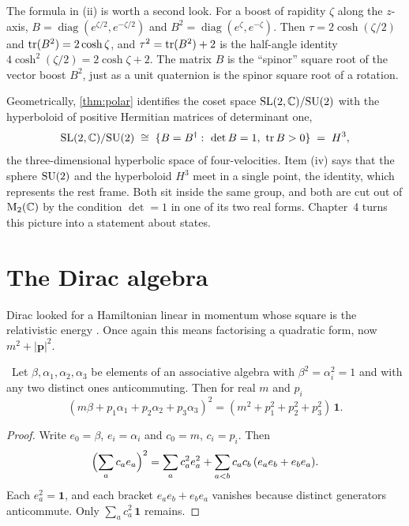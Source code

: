 The formula in (ii) is worth a second look. For a boost of rapidity $\zeta$ along the $z$-axis, $B=\operatorname{diag}(e^{\zeta/2},e^{-\zeta/2})$ and $B^2=\operatorname{diag}(e^{\zeta},e^{-\zeta})$. Then $\tau=2\cosh(\zeta/2)$ and $\operatorname{tr}(B^2)=2\cosh\zeta$, and $\tau^2=\operatorname{tr}(B^2)+2$ is the half-angle identity $4\cosh^2(\zeta/2)=2\cosh\zeta+2$. The matrix $B$ is the ``spinor'' square root of the vector boost $B^2$, just as a unit quaternion is the spinor square root of a rotation.

Geometrically, \cref{thm:polar} identifies the coset space $\mathrm{SL}(2,\mathbb{C})/\mathrm{SU}(2)$ with the hyperboloid of positive Hermitian matrices of determinant one,
\[
\mathrm{SL}(2,\mathbb{C})/\mathrm{SU}(2)\;\cong\;\{B=B^\dagger:\ \det B=1,\ \operatorname{tr} B>0\}\;=\;H^3 ,
\]
the three-dimensional hyperbolic space of four-velocities. Item (iv) says that the sphere $\mathrm{SU}(2)$ and the hyperboloid $H^3$ meet in a single point, the identity, which represents the rest frame. Both sit inside the same group, and both are cut out of $\mathrm{M}_2(\mathbb{C})$ by the condition $\det=1$ in one of its two real forms. Chapter~4 turns this picture into a statement about states.

\section{The Dirac algebra}

Dirac looked for a Hamiltonian linear in momentum whose square is the relativistic energy \cite{Dirac1928}. Once again this means factorising a quadratic form, now $m^2+|\mathbf p|^2$.

\begin{theorem}\label{thm:diracsq}\ver\
Let $\beta,\alpha_1,\alpha_2,\alpha_3$ be elements of an associative algebra with $\beta^2=\alpha_i^2=1$ and with any two distinct ones anticommuting. Then for real $m$ and $p_i$
\[
(m\beta+p_1\alpha_1+p_2\alpha_2+p_3\alpha_3)^2=(m^2+p_1^2+p_2^2+p_3^2)\,\mathbf 1 .
\]
\end{theorem}
\begin{proof}
Write $e_0=\beta$, $e_i=\alpha_i$ and $c_0=m$, $c_i=p_i$. Then
\[
\Bigl(\sum_ac_ae_a\Bigr)^2=\sum_ac_a^2e_a^2+\sum_{a<b}c_ac_b\,(e_ae_b+e_be_a).
\]
Each $e_a^2=\mathbf 1$, and each bracket $e_ae_b+e_be_a$ vanishes because distinct generators anticommute. Only $\sum_ac_a^2\,\mathbf 1$ remains.
\end{proof}


